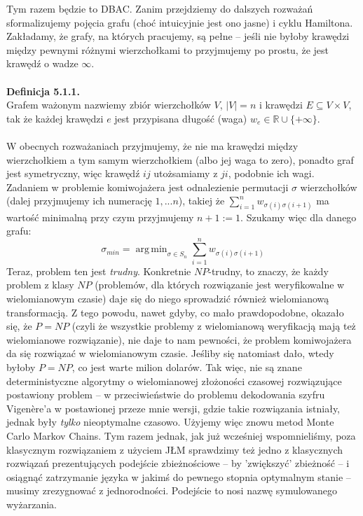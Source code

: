 \documentclass[a4paper]{article}
\DeclareMathOperator*{\argmin}{arg\,min}
\theoremstyle{defn}
\theoremstyle{theorem}
\theoremstyle{lemma}
\theoremstyle{cor}
\theoremstyle{fact}
\begin{document}
Tym razem będzie to DBAC. Zanim przejdziemy do dalszych rozważań sformalizujemy pojęcia grafu (choć intuicyjnie jest ono jasne) i cyklu Hamiltona. Zakładamy, że grafy, na których pracujemy, są pełne – jeśli nie byłoby krawędzi między pewnymi różnymi wierzchołkami to przyjmujemy po prostu, że jest krawędź o wadze $\infty$.\\
\\
\textbf{Definicja 5.1.1.}\\
Grafem ważonym nazwiemy zbiór wierzchołków $V$, $|V| = n$ i krawędzi $E \subseteq V \times V$, tak że każdej krawędzi $e$ jest przypisana długość (waga) $w_e \in \mathbb{R} \cup \{+\infty\}$. \\
\\
W obecnych rozważaniach przyjmujemy, że nie ma krawędzi między wierzchołkiem a tym samym wierzchołkiem (albo jej waga to zero), ponadto graf jest symetryczny, więc krawędź $ij$ utożsamiamy z $ji$, podobnie ich wagi. Zadaniem w problemie komiwojażera jest odnalezienie permutacji $\sigma$ wierzchołków (dalej przyjmujemy ich numerację $1,...n$), takiej że $\sum\limits_{i = 1}^n w_{\sigma(i)\sigma(i+1)}$ ma wartość minimalną przy czym przyjmujemy $n+1 := 1$. Szukamy więc dla danego grafu:
$$ \sigma_{min} = \argmin_{\sigma \in S_n} \sum\limits_{i=1}^n w_{\sigma(i)\sigma(i+1)}$$
Teraz, problem ten jest \textit{trudny}. Konkretnie $NP$-trudny, to znaczy, że każdy problem z klasy $NP$ (problemów, dla których rozwiązanie jest weryfikowalne w wielomianowym czasie) daje się do niego sprowadzić również wielomianową transformacją. Z tego powodu, nawet gdyby, co mało prawdopodobne, okazało się, że $P=NP$ (czyli że wszystkie problemy z wielomianową weryfikacją mają też wielomianowe rozwiązanie), nie daje to nam pewności, że problem komiwojażera da się rozwiązać w wielomianowym czasie. Jeśliby się natomiast dało, wtedy byłoby $P=NP$, co jest warte milion dolarów. Tak więc, nie są znane deterministyczne algorytmy o wielomianowej złożoności czasowej rozwiązujące postawiony problem – w przeciwieństwie do problemu dekodowania szyfru Vigenère'a w postawionej przeze mnie wersji, gdzie takie rozwiązania istniały, jednak były \textit{tylko} nieoptymalne czasowo. Użyjemy więc znowu metod Monte Carlo Markov Chains. Tym razem jednak, jak już wcześniej wspomnieliśmy, poza klasycznym rozwiązaniem z użyciem JŁM sprawdzimy też jedno z klasycznych rozwiązań prezentujących podejście zbieżnościowe – by 'zwiększyć' zbieżność – i osiągnąć zatrzymanie języka w jakimś do pewnego stopnia optymalnym stanie – musimy zrezygnować z jednorodności. Podejście to nosi nazwę symulowanego wyżarzania.
\end{document}
